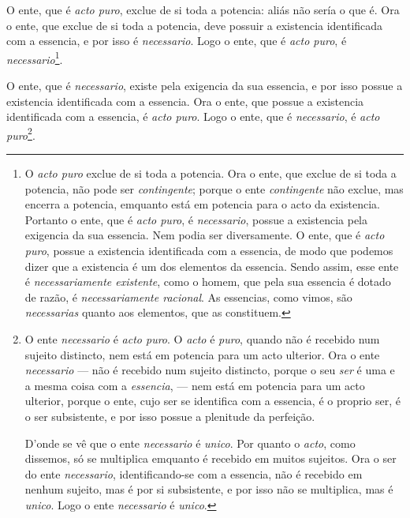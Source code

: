 
 O ente, que é \emph{acto puro}, exclue de
si toda a potencia: aliás não sería o que é. Ora o ente, que exclue de si toda a
potencia, deve possuir a existencia identificada com a essencia, e por isso é
\emph{necessario}. Logo o ente, que é \emph{acto puro}, é \emph{necessario}\footnote{O
\emph{acto puro} exclue de si toda a potencia. Ora o ente, que exclue de si toda a
potencia, não pode ser \emph{contingente}; porque o ente \emph{contingente} não exclue,
mas encerra a potencia, emquanto está em potencia para o acto da existencia. Portanto o
ente, que é \emph{acto puro}, é \emph{necessario}, possue a existencia pela exigencia da
sua essencia. Nem podia ser diversamente. O ente, que é \emph{acto puro}, possue a
existencia identificada com a essencia, de modo que podemos dizer que a existencia é um
dos elementos da essencia. Sendo assim, esse ente é \emph{necessariamente existente},
como o homem, que pela sua essencia é dotado de razão, é \emph{necessariamente racional}.
As essencias, como vimos, são \emph{necessarias} quanto aos elementos, que as
constituem.}.

 O ente, que é \emph{necessario}, existe
pela exigencia da sua essencia, e por isso possue a existencia identificada com a
essencia. Ora o ente, que possue a existencia identificada com a essencia, é \emph{acto
puro}. Logo o ente, que é \emph{necessario}, é \emph{acto puro}\footnote{O ente
\emph{necessario} é \emph{acto puro}. O \emph{acto} é \emph{puro}, quando não é recebido
num sujeito distincto, nem está em potencia para um acto ulterior. Ora o ente
\emph{necessario} --- não é recebido num sujeito distincto, porque o seu \emph{ser} é uma
e a mesma coisa com a \emph{essencia}, --- nem está em potencia para um acto ulterior,
porque o ente, cujo ser se identifica com a essencia, é o proprio ser, é o ser
subsistente, e por isso possue a plenitude da perfeição.

D'onde se vê que o ente \emph{necessario} é \emph{unico}. Por quanto o \emph{acto}, como
dissemos, só se multiplica emquanto é recebido em muitos sujeitos. Ora o ser do ente
\emph{necessario}, identificando-se com a essencia, não é recebido em nenhum sujeito, mas
é por si subsistente, e por isso não se multiplica, mas é \emph{unico}. Logo o ente
\emph{necessario} é \emph{unico}.}.


